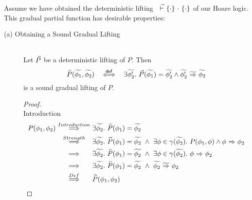 Assume we have obtained the deterministic lifting ${~} \,\,\vec{\vdash}\,\, \{{\cdot}\} ~{\cdot}~ \{{\cdot}\}$ of our Hoare logic.
This gradual partial function has desirable properties:
\begin{description}
    \item[(a) Obtaining a Sound Gradual Lifting]
    \begin{lemma}~\\
        \label{lem:det2grad}
        Let $\vec{P}$ be a deterministic lifting of $P$.
        Then
        \begin{displaymath}
        \widetilde{P}(\widetilde{\phi_1}, \widetilde{\phi_2}) ~~\overset{\textup{\textmd{\textsf{def}}}}{\iff}~~ \exists \widetilde{\phi_2'}.~ \vec{P}(\widetilde{\phi_1}) = \widetilde{\phi_2'} \wedge {\widetilde{\phi_2'}} \,\,{\widetilde{\Rightarrow}}\,\, {\widetilde{\phi_2}}
        \end{displaymath}
        is a sound gradual lifting of $P$.
    \end{lemma}
    \begin{proof}~\\
        Introduction
        \begin{align*}
        P(\phi_1, \phi_2)
        &\overset{Introduction}{~\quad\implies\quad~} \exists \widetilde{\phi_2}.~ \widetilde{P}(\phi_1) = \widetilde{\phi_2}\\
        &\overset{Strength}{~\quad\implies\quad~} \exists \widetilde{\phi_2}.~ \widetilde{P}(\phi_1) = \widetilde{\phi_2} ~\wedge~ \exists \phi \in \gamma(\widetilde{\phi_2}).~ P(\phi_1, \phi) \wedge {\phi} \,\,{\Rightarrow}\,\, {\phi_2} \\
        &\overset{}{~\quad\implies\quad~} \exists \widetilde{\phi_2}.~ \widetilde{P}(\phi_1) = \widetilde{\phi_2} ~\wedge~ \exists \phi \in \gamma(\widetilde{\phi_2}).~ {\phi} \,\,{\Rightarrow}\,\, {\phi_2} \\
        &\overset{}{~\quad\implies\quad~} \exists \widetilde{\phi_2}.~ \widetilde{P}(\phi_1) = \widetilde{\phi_2} ~\wedge~  {\widetilde{\phi_2}} \,\,{\widetilde{\Rightarrow}}\,\, {\phi_2} \\
        &\overset{Def}{~\quad\implies\quad~} \widetilde{P}(\phi_1, \phi_2) \\
        \end{align*}
            

\end{proof}
\end{description}
